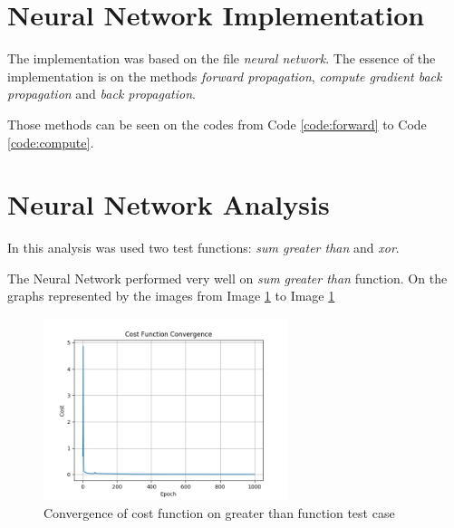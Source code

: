 \documentclass[journal]{IEEEtran}
\begin{document}
\section{Neural Network Implementation}

The implementation was based on the file \textit{neural network}. The essence of the implementation is on the methods \textit{forward propagation}, \textit{compute gradient back propagation} and \textit{back propagation}.

Those methods can be seen on the codes from Code \ref{code:forward} to Code \ref{code:compute}.







\section{Neural Network Analysis}

In this analysis was used two test functions: \textit{sum greater than} and \textit{xor}.

The Neural Network performed very well on \textit{sum greater than} function. On the graphs represented by the images from Image \ref{img:greater_cost} to Image \ref{img:greater_cost}

\begin{figure}
  \begin{center}
  \includegraphics[width=2.8in]{./../code/result_greater_than/cost_function_convergence.png}
  \caption{Convergence of cost function on greater than function test case}
  \label{img:greater_cost}
  \end{center}
\end{figure}
\end{document}
